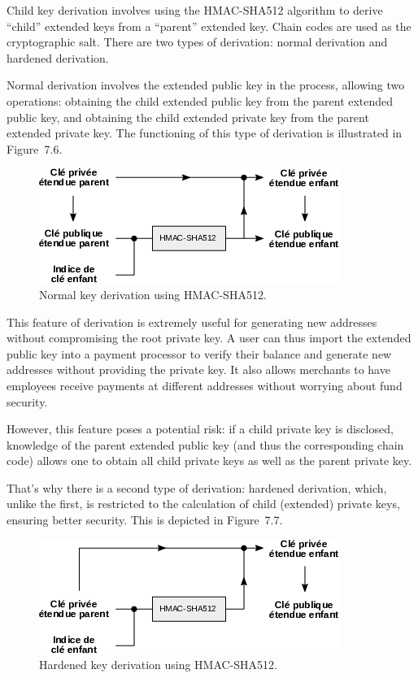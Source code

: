 \documentclass[
  a5paper,
  smalldemyvopaper,10pt,twoside,onecolumn,openright,extrafontsizes,hidelinks]{memoir}
\begin{document}
Child key derivation involves using the HMAC-SHA512 algorithm to derive
``child'' extended keys from a ``parent'' extended key. Chain codes are
used as the cryptographic salt. There are two types of derivation:
normal derivation and hardened derivation.

Normal derivation involves the extended public key in the process,
allowing two operations: obtaining the child extended public key from
the parent extended public key, and obtaining the child extended private
key from the parent extended private key. The functioning of this type
of derivation is illustrated in Figure~7.6.

\begin{figure}

{\centering \includegraphics{chapters/img/normal-child-key-derivation.png}

}

\caption{Normal key derivation using HMAC-SHA512.}

\end{figure}%

This feature of derivation is extremely useful for generating new
addresses without compromising the root private key. A user can thus
import the extended public key into a payment processor to verify their
balance and generate new addresses without providing the private key. It
also allows merchants to have employees receive payments at different
addresses without worrying about fund security.

However, this feature poses a potential risk: if a child private key is
disclosed, knowledge of the parent extended public key (and thus the
corresponding chain code) allows one to obtain all child private keys as
well as the parent private key.

That's why there is a second type of derivation: hardened derivation,
which, unlike the first, is restricted to the calculation of child
(extended) private keys, ensuring better security. This is depicted in
Figure~7.7.

\begin{figure}

{\centering \includegraphics{chapters/img/hardened-child-key-derivation.png}

}

\caption{Hardened key derivation using HMAC-SHA512.}

\end{figure}%
\end{document}
